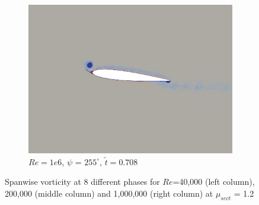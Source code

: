 \begin{figure}[H]
\begin{subfigure}[b]{0.32\textwidth}
		\includegraphics[width=1\textwidth]{figures/Vorticity_plots/Re_1m_1pt2/phase_255.png}
		\caption{$Re=1e6$, $\psi$ = $255^\circ$, $\tilde{t}=0.708$}
		\label{fig:Re_1m_1pt2_phi255}
	\end{subfigure}
	
	\caption{Spanwise vorticity at 8 different phases for $Re$=40,000 (left column), 200,000 (middle column) and 1,000,000 (right column) at $\mu_{sect}$ = 1.2}
\end{figure}


